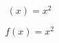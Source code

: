 \documentclass{article}
\begin{document}
\begin{equation}
    (x) = x^2
\end{equation}

\begin{equation*}
  f(x) = x^2
\end{equation*}
\end{document}
